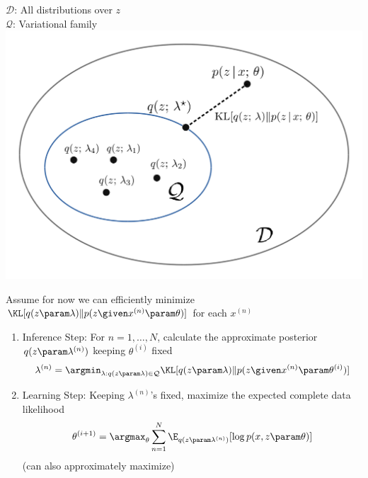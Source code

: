 \begin{frame}
$\mathcal{D}$: All distributions over $z$ \\
$\mathcal{Q}$: Variational family 
\center
\includegraphics[scale=0.26]{pics/vi5.png}
\end{frame}


\begin{frame}
Assume for now we can efficiently minimize $\KL [q(z \param \lambda) \Vert p(z \given x^{(n)} \param \theta)]$ for each $x^{(n)}$

\begin{enumerate}
    \item Inference Step: For $n = 1, \dots, N$, calculate the approximate posterior $q(z  \param \lambda^{(n)})$ keeping $\theta^{(i)}$ fixed
    \[ \lambda^{(n)} = \argmin_{\lambda: q(z \param \lambda) \in \mathcal{Q}} \KL [q(z \param \lambda) \Vert p(z \given x^{(n)} \param \theta^{(i)})]\]
    \item Learning Step: Keeping $\lambda^{(n)}$'s fixed, maximize the expected complete data likelihood 
    \[ \theta^{(i+1)} = \argmax_{\theta} \sum_{n=1}^N \E_{q(z \param \lambda^{(n)})}[\log p(x, z \param \theta)] \]
    (can also approximately maximize)
\end{enumerate}
\end{frame}

